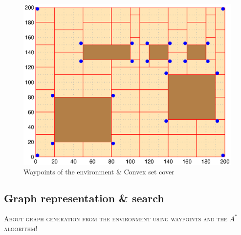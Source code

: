 \begin{figure}[h!t]
	\includegraphics[width=\linewidth]{fig/convexCover.eps}
	\caption{Waypoints of the environment \& Convex set cover}
	\label{convexCover}
\end{figure}


\subsection{Graph representation \& search}

\textsc{About graph generation from the environment using waypoints and the $A^{\ast}$ algorithm!}
